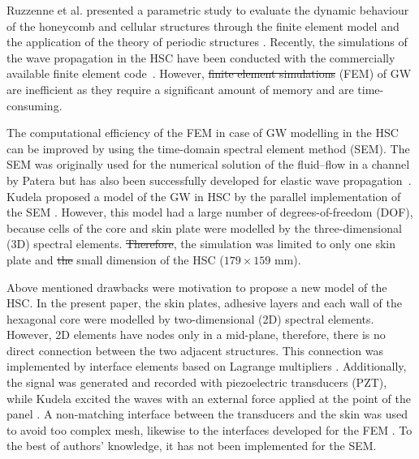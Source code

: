 \documentclass[materials,article,submit,moreauthors,pdftex]{Definitions/mdpi}
\providecommand{\DIFadd}[1]{{\protect\color{blue}{#1}}} %
\providecommand{\DIFdel}[1]{{\protect\color{red}\sout{#1}}}                      %
\providecommand{\DIFaddbegin}{} %
\providecommand{\DIFaddend}{} %
\providecommand{\DIFdelbegin}{} %
\providecommand{\DIFdelend}{} %
\begin{document}
Ruzzenne et al. presented a parametric study to evaluate the dynamic behaviour of the honeycomb and cellular structures through the finite element model and the application of the theory of periodic structures \cite{ruzzene2003wave}.
Recently, the simulations of the wave propagation in the HSC have been conducted with the commercially available finite element code~\cite{song2009guided, hosseini2013numerical, tian2015wavenumber, zhao2018wave}.
However, \DIFdelbegin \DIFdel{finite element simulations }\DIFdelend \DIFaddbegin \DIFadd{the finite element method }\DIFaddend (FEM) of GW are inefficient as they require a significant amount of memory and are time-consuming.

The computational efficiency of the FEM in case of GW modelling in the HSC can be improved by using the time-domain spectral element method (SEM).
The SEM was originally used for the numerical solution of the fluid--flow in a channel by Patera \cite{patera1984spectral} but has also been successfully developed for elastic wave propagation~\cite{ostachowicz2011guided}.
Kudela proposed a model of the GW in HSC by the parallel implementation of the SEM \cite{kudela2016parallel}.
However, this model had a large number \DIFaddbegin \DIFadd{(1.5 million) }\DIFaddend of degrees-of-freedom (DOF), because cells of the core and skin plate were modelled by the three-dimensional (3D) spectral elements.
\DIFdelbegin \DIFdel{Therefore}\DIFdelend \DIFaddbegin \DIFadd{Although}\DIFaddend , the simulation was limited to only one skin plate and \DIFdelbegin \DIFdel{the }\DIFdelend \DIFaddbegin \DIFadd{a }\DIFaddend small dimension of the HSC (\(179 \times 159 \) mm).

Above mentioned drawbacks were motivation to propose a new model of the HSC. In the present paper, the skin plates, adhesive layers and each wall of the hexagonal core were modelled by two-dimensional (2D) spectral elements.
However, 2D elements have nodes only in a mid-plane, therefore, there is no direct connection between the two adjacent structures.
This connection was implemented by interface elements based on Lagrange multipliers \cite{ashwin2014formulation, fiborek20192d}.
Additionally, the signal was generated and recorded with piezoelectric transducers (PZT), while Kudela excited the waves with an external force applied at the point of the panel \cite{kudela2016parallel}.
A non-matching interface between the transducers and the skin was used to avoid too complex mesh, likewise to the interfaces developed for the FEM \cite{flemisch2000elasto, flemisch2012non}. To the best of authors’
knowledge, it has not been implemented for the SEM.
\end{document}
